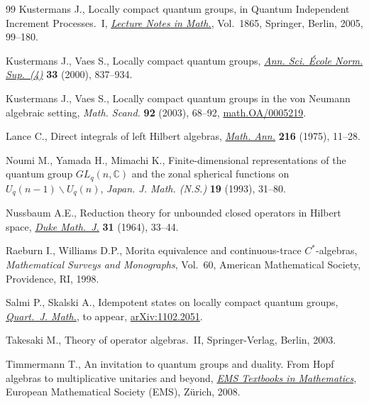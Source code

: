 \documentclass[11pt]{article}
\numberwithin{equation}{section}
\theoremstyle{definition}
\begin{document}
\begin{thebibliography}{99}
 Kustermans  J.,
  Locally compact quantum groups,
in Quantum Independent Increment Processes.~I,
\href{http://dx.doi.org/10.1007/11376569_2}{{\it Lecture Notes in Math.}}, Vol.~1865, Springer, Berlin, 2005, 99--180.

 Kustermans  J., Vaes S.,
  Locally compact quantum groups,
\href{http://dx.doi.org/10.1016/S0012-9593(00)01055-7}{\emph{Ann. Sci. \'Ecole Norm. Sup.~(4)}} {\bf 33}  (2000), 837--934.

 Kustermans  J., Vaes S.,
  Locally compact quantum groups in the von Neumann algebraic setting,
  \emph{Math. Scand.} {\bf 92} (2003), 68--92,
\href{http://arxiv.org/abs/math.OA/0005219}{math.OA/0005219}.

  Lance C.,
  Direct integrals of left Hilbert algebras,
\href{http://dx.doi.org/10.1007/BF02547968}{\emph{Math. Ann.}}  {\bf 216}  (1975), 11--28.

  Noumi M., Yamada H., Mimachi K.,
 Finite-dimensional representations of the quantum group $GL_q(n, \mathbb{C})$ and the zonal spherical functions on $U_q(n-1)\backslash U_q(n)$,
   \emph{Japan. J. Math. (N.S.)} {\bf 19} (1993), 31--80.

  Nussbaum A.E.,
  Reduction theory for unbounded closed operators in Hilbert space,
\href{http://dx.doi.org/10.1215/S0012-7094-64-03103-5}{\emph{Duke Math.~J.}} {\bf 31} (1964), 33--44.



   Raeburn  I., Williams D.P.,
     Morita equivalence and continuous-trace $C^\ast$-algebras,
{\it Mathematical Surveys and Monographs}, Vol.~60, American Mathematical Society, Providence, RI, 1998.

 Salmi P., Skalski A.,
 Idempotent states on locally compact quantum groups,
\href{http://dx.doi.org/10.1093/qmath/har023}{\emph{Quart.~J. Math.}}, to appear,
\href{http://arxiv.org/abs/1102.2051}{arXiv:1102.2051}.



 Takesaki  M.,
  Theory of operator algebras.~II,
Springer-Verlag, Berlin, 2003.


Timmermann  T.,
An invitation to quantum groups and duality. From Hopf algebras to multiplicative unitaries and beyond,
\href{http://dx.doi.org/10.4171/043}{{\it EMS Textbooks in Mathematics}},  European Mathematical Society (EMS), Z\"urich, 2008.


\end{thebibliography}
\end{document}
